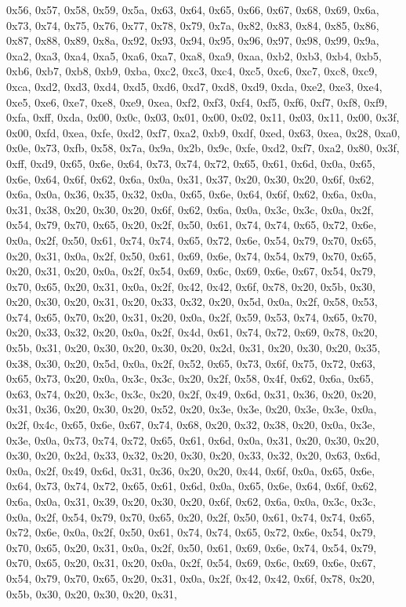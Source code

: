\documentclass[
]{book}
\begin{document}
0x56, 0x57, 0x58, 0x59, 0x5a, 0x63, 0x64, 0x65, 0x66, 0x67, 0x68, 0x69, 0x6a, 0x73, 0x74, 0x75, 0x76, 0x77, 0x78, 0x79, 0x7a, 0x82, 0x83, 0x84, 0x85, 0x86, 0x87, 0x88, 0x89, 0x8a, 0x92, 0x93, 0x94, 0x95, 0x96, 0x97, 0x98, 0x99, 0x9a, 0xa2, 0xa3, 0xa4, 0xa5, 0xa6, 0xa7, 0xa8, 0xa9, 0xaa, 0xb2, 0xb3, 0xb4, 0xb5, 0xb6, 0xb7, 0xb8, 0xb9, 0xba, 0xc2, 0xc3, 0xc4, 0xc5, 0xc6, 0xc7, 0xc8, 0xc9, 0xca, 0xd2, 0xd3, 0xd4, 0xd5, 0xd6, 0xd7, 0xd8, 0xd9, 0xda, 0xe2, 0xe3, 0xe4, 0xe5, 0xe6, 0xe7, 0xe8, 0xe9, 0xea,
0xf2, 0xf3, 0xf4, 0xf5, 0xf6, 0xf7, 0xf8, 0xf9, 0xfa, 0xff, 0xda, 0x00, 0x0c, 0x03, 0x01, 0x00, 0x02, 0x11, 0x03, 0x11, 0x00, 0x3f, 0x00, 0xfd, 0xea, 0xfe, 0xd2, 0xf7, 0xa2, 0xb9, 0xdf, 0xed, 0x63, 0xea, 0x28, 0xa0, 0x0e, 0x73, 0xfb, 0x58, 0x7a, 0x9a, 0x2b, 0x9c, 0xfe, 0xd2, 0xf7, 0xa2, 0x80, 0x3f, 0xff, 0xd9, 0x65, 0x6e, 0x64, 0x73, 0x74, 0x72, 0x65, 0x61, 0x6d, 0x0a, 0x65, 0x6e, 0x64, 0x6f, 0x62, 0x6a, 0x0a, 0x31, 0x37, 0x20, 0x30, 0x20, 0x6f, 0x62, 0x6a, 0x0a, 0x36, 0x35, 0x32, 0x0a, 0x65, 0x6e,
0x64, 0x6f, 0x62, 0x6a, 0x0a, 0x31, 0x38, 0x20, 0x30, 0x20, 0x6f, 0x62, 0x6a, 0x0a, 0x3c, 0x3c, 0x0a, 0x2f, 0x54, 0x79, 0x70, 0x65, 0x20, 0x2f, 0x50, 0x61, 0x74, 0x74, 0x65, 0x72, 0x6e, 0x0a, 0x2f, 0x50, 0x61, 0x74, 0x74, 0x65, 0x72, 0x6e, 0x54, 0x79, 0x70, 0x65, 0x20, 0x31, 0x0a, 0x2f, 0x50, 0x61, 0x69, 0x6e, 0x74, 0x54, 0x79, 0x70, 0x65, 0x20, 0x31, 0x20, 0x0a, 0x2f, 0x54, 0x69, 0x6c, 0x69, 0x6e, 0x67, 0x54, 0x79, 0x70, 0x65, 0x20, 0x31, 0x0a, 0x2f, 0x42, 0x42, 0x6f, 0x78, 0x20, 0x5b, 0x30, 0x20,
0x30, 0x20, 0x31, 0x20, 0x33, 0x32, 0x20, 0x5d, 0x0a, 0x2f, 0x58, 0x53, 0x74, 0x65, 0x70, 0x20, 0x31, 0x20, 0x0a, 0x2f, 0x59, 0x53, 0x74, 0x65, 0x70, 0x20, 0x33, 0x32, 0x20, 0x0a, 0x2f, 0x4d, 0x61, 0x74, 0x72, 0x69, 0x78, 0x20, 0x5b, 0x31, 0x20, 0x30, 0x20, 0x30, 0x20, 0x2d, 0x31, 0x20, 0x30, 0x20, 0x35, 0x38, 0x30, 0x20, 0x5d, 0x0a, 0x2f, 0x52, 0x65, 0x73, 0x6f, 0x75, 0x72, 0x63, 0x65, 0x73, 0x20, 0x0a, 0x3c, 0x3c, 0x20, 0x2f, 0x58, 0x4f, 0x62, 0x6a, 0x65, 0x63, 0x74, 0x20, 0x3c, 0x3c, 0x20, 0x2f,
0x49, 0x6d, 0x31, 0x36, 0x20, 0x20, 0x31, 0x36, 0x20, 0x30, 0x20, 0x52, 0x20, 0x3e, 0x3e, 0x20, 0x3e, 0x3e, 0x0a, 0x2f, 0x4c, 0x65, 0x6e, 0x67, 0x74, 0x68, 0x20, 0x32, 0x38, 0x20, 0x0a, 0x3e, 0x3e, 0x0a, 0x73, 0x74, 0x72, 0x65, 0x61, 0x6d, 0x0a, 0x31, 0x20, 0x30, 0x20, 0x30, 0x20, 0x2d, 0x33, 0x32, 0x20, 0x30, 0x20, 0x33, 0x32, 0x20, 0x63, 0x6d, 0x0a, 0x2f, 0x49, 0x6d, 0x31, 0x36, 0x20, 0x20, 0x44, 0x6f, 0x0a, 0x65, 0x6e, 0x64, 0x73, 0x74, 0x72, 0x65, 0x61, 0x6d, 0x0a, 0x65, 0x6e, 0x64, 0x6f, 0x62,
0x6a, 0x0a, 0x31, 0x39, 0x20, 0x30, 0x20, 0x6f, 0x62, 0x6a, 0x0a, 0x3c, 0x3c, 0x0a, 0x2f, 0x54, 0x79, 0x70, 0x65, 0x20, 0x2f, 0x50, 0x61, 0x74, 0x74, 0x65, 0x72, 0x6e, 0x0a, 0x2f, 0x50, 0x61, 0x74, 0x74, 0x65, 0x72, 0x6e, 0x54, 0x79, 0x70, 0x65, 0x20, 0x31, 0x0a, 0x2f, 0x50, 0x61, 0x69, 0x6e, 0x74, 0x54, 0x79, 0x70, 0x65, 0x20, 0x31, 0x20, 0x0a, 0x2f, 0x54, 0x69, 0x6c, 0x69, 0x6e, 0x67, 0x54, 0x79, 0x70, 0x65, 0x20, 0x31, 0x0a, 0x2f, 0x42, 0x42, 0x6f, 0x78, 0x20, 0x5b, 0x30, 0x20, 0x30, 0x20, 0x31,
\end{document}
